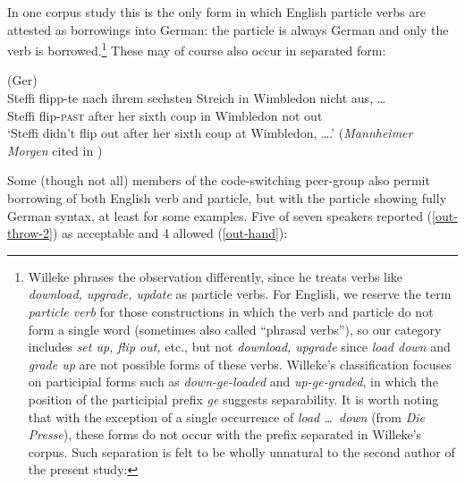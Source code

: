 \documentclass[output=paper]{langscibook}
\begin{document}
In one corpus study \citep{willeke06} this is the only form in which English particle verbs are attested as borrowings into German: the particle is always German and only the verb is borrowed.\footnote{Willeke phrases the observation differently, since he treats verbs like \textit{download, upgrade, update} as particle verbs. For English, we reserve the term \textit{particle verb} for those constructions in which the verb and particle do not form a single word (sometimes also called ``phrasal verbs''), so our category includes \textit{set up, flip out,} etc., but not \textit{download, upgrade} since \textit{load down} and \textit{grade up} are not possible forms of these verbs. Willeke's classification focuses on participial forms such as \textit{down-ge-loaded} and \textit{up-ge-graded}, in which the position of the participial prefix \textit{ge} suggests separability. It is worth noting that with the exception of a single occurrence of \textit{load \ldots\ down} (from \textit{Die Presse}), these forms do not occur with the prefix separated in Willeke's corpus. Such separation is felt to be wholly unnatural to the second author of the present study:

\ea
{}
\z\z

} These may of course also occur in separated form:

\ea(Ger)\\\gll Steffi flipp-te nach ihrem sechsten Streich in Wimbledon nicht aus, \ldots\\
Steffi flip-\textsc{past} after her sixth coup in Wimbledon not out\\
\glt `Steffi didn't flip out after her sixth coup at Wimbledon, \ldots.' (\textit{Mannheimer Morgen} cited in \citealp[67]{willeke06})
\z 

Some (though not all) members of the code-switching peer-group also permit borrowing of both English verb and particle, but with the particle showing fully German syntax, at least for some examples. Five of seven speakers reported (\ref{out-throw-2}) as acceptable and 4 allowed (\ref{out-hand}):\largerpage

\ea\label{part.eng-verb}\judgewidth{\%}
\z\z 
\end{document}
